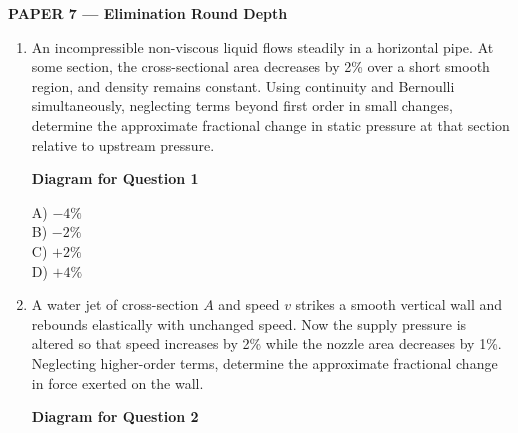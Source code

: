 \documentclass[12pt]{article}
\begin{document}
\begin{center}
\Large \textbf{PAPER 7 — Elimination Round Depth}
\end{center}

\begin{enumerate}

\item An incompressible non-viscous liquid flows steadily in a horizontal pipe. At some section, the cross-sectional area decreases by 2\% over a short smooth region, and density remains constant. Using continuity and Bernoulli simultaneously, neglecting terms beyond first order in small changes, determine the approximate fractional change in static pressure at that section relative to upstream pressure.

\begin{center}
\textbf{Diagram for Question 1}
\end{center}

A) $-4\%$ \\
B) $-2\%$ \\
C) $+2\%$ \\
D) $+4\%$

\item A water jet of cross-section $A$ and speed $v$ strikes a smooth vertical wall and rebounds elastically with unchanged speed. Now the supply pressure is altered so that speed increases by 2\% while the nozzle area decreases by 1\%. Neglecting higher-order terms, determine the approximate fractional change in force exerted on the wall.

\begin{center}
\textbf{Diagram for Question 2}
\end{center}
\end{enumerate}
\end{document}
